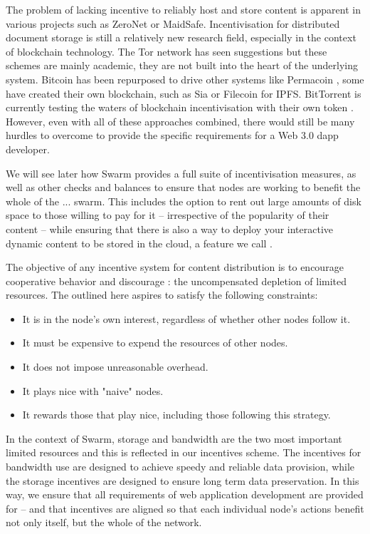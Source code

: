 The problem of lacking incentive to reliably host and store content is apparent in various projects such as ZeroNet or MaidSafe. Incentivisation for distributed document storage is still a relatively new research field, especially in the context of blockchain technology. The Tor network has seen suggestions \cite{jansen2014onions,ghoshetal2014tor} but these schemes are mainly academic, they are not built into the heart of the underlying system. Bitcoin has been repurposed to drive other systems like Permacoin \cite{miller2014permacoin}, some have created their own blockchain, such as Sia \cite{vorick2014sia} or Filecoin \cite{filecoin2014} for IPFS. BitTorrent is currently testing the waters of blockchain incentivisation with their own token \cite{tron2018,bittorrent2019}. However, even with all of these approaches combined, there would still be many hurdles to overcome to provide the specific requirements for a Web 3.0 dapp developer.

We will see later how Swarm provides a full suite of incentivisation measures, as well as other checks and balances to ensure that nodes are working to benefit the whole of the ... swarm. This includes the option to rent out large amounts of disk space to those willing to pay for it – irrespective of the popularity of their content – while ensuring that there is also a way to deploy your interactive dynamic content to be stored in the cloud, a feature we call .

The objective of any incentive system for  content distribution is to encourage cooperative behavior and discourage : the uncompensated depletion of limited resources. The  outlined here aspires to satisfy the following constraints:

\begin{itemize}
    \item It is in the node's own interest, regardless of whether other nodes follow it.
    \item It must be expensive to expend the resources of other nodes.
    \item It does not impose unreasonable overhead.
    \item It plays nice with "naive" nodes.
    \item It rewards those that play nice, including those following this strategy.
\end{itemize}

In the context of Swarm, storage and bandwidth are the two most important limited resources and this is reflected in our incentives scheme. The incentives for bandwidth use are designed to achieve speedy and reliable data provision, while the storage incentives are designed to ensure long term data preservation. In this way, we ensure that all requirements of web application development are provided for – and that incentives are aligned so that each individual node's actions benefit not only itself, but the whole of the network. 

